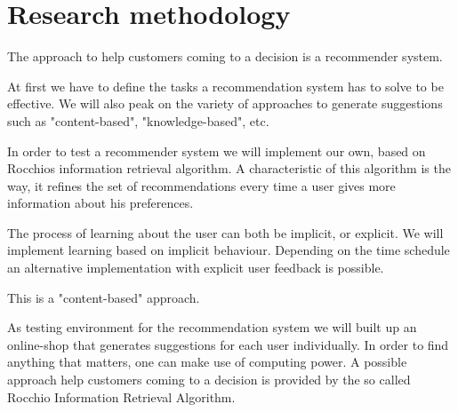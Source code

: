 


\section{Research methodology}

The approach to help customers coming to a decision is a recommender system.

At first we have to define the tasks a recommendation system has to solve to be effective.
We will also peak on the variety of approaches to generate suggestions such as "content-based", "knowledge-based", etc.

In order to test a recommender system we will implement our own, based on Rocchios information retrieval algorithm.
A characteristic of this algorithm is the way, it refines the set of recommendations every time a user gives more information about his preferences.\citep[p. 92]{lops:11}

The process of learning about the user can both be implicit, or explicit.
We will implement learning based on implicit behaviour.
Depending on the time schedule an alternative implementation with explicit user feedback is possible.





This is a "content-based" approach.

As testing environment for the recommendation system we will built up an online-shop that generates suggestions for each user individually.
In order to find anything that matters, one can make use of computing power.
A possible approach help customers coming to a decision is provided by the so called Rocchio Information Retrieval Algorithm.


